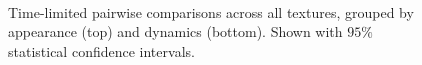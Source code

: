 \begin{figure}[t]
	\centering
	\\
	\caption[Time-limited pairwise comparisons across all textures, grouped by appearance and dynamics.]{Time-limited pairwise comparisons across all textures, grouped by appearance (top) and dynamics (bottom).  Shown with $95\%$ statistical confidence intervals.
	}
	\label{fig:pairwise_grouped}
	\vspace{-0.2cm}
\end{figure}
